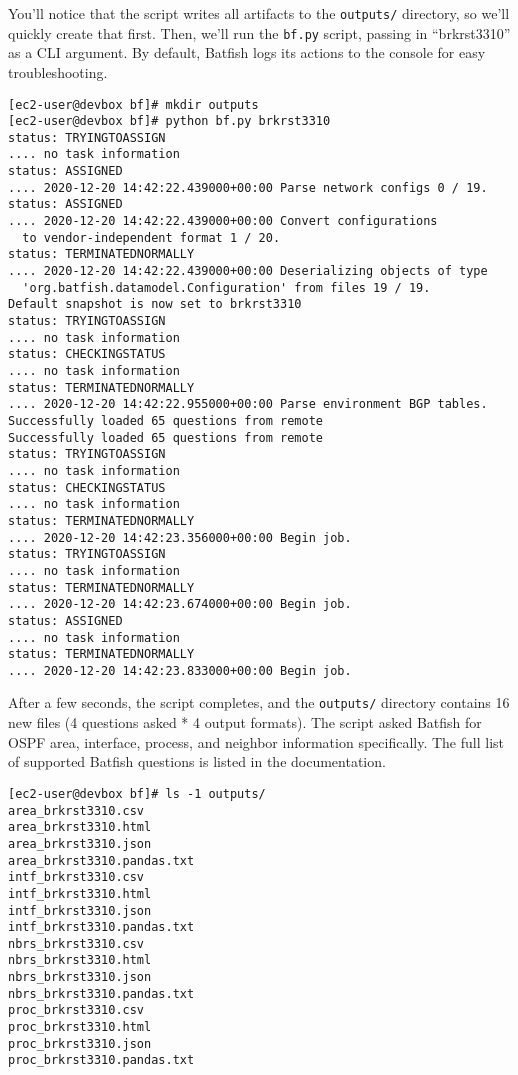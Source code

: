 You'll notice that the script writes all artifacts to the \verb|outputs/|
directory, so we'll quickly create that first. Then, we'll run the
\verb|bf.py| script, passing in ``brkrst3310'' as a CLI argument. By default,
Batfish logs its actions to the console for easy troubleshooting.

\begin{verbatim}
[ec2-user@devbox bf]# mkdir outputs
[ec2-user@devbox bf]# python bf.py brkrst3310
status: TRYINGTOASSIGN
.... no task information
status: ASSIGNED
.... 2020-12-20 14:42:22.439000+00:00 Parse network configs 0 / 19.
status: ASSIGNED
.... 2020-12-20 14:42:22.439000+00:00 Convert configurations
  to vendor-independent format 1 / 20.
status: TERMINATEDNORMALLY
.... 2020-12-20 14:42:22.439000+00:00 Deserializing objects of type
  'org.batfish.datamodel.Configuration' from files 19 / 19.
Default snapshot is now set to brkrst3310
status: TRYINGTOASSIGN
.... no task information
status: CHECKINGSTATUS
.... no task information
status: TERMINATEDNORMALLY
.... 2020-12-20 14:42:22.955000+00:00 Parse environment BGP tables.
Successfully loaded 65 questions from remote
Successfully loaded 65 questions from remote
status: TRYINGTOASSIGN
.... no task information
status: CHECKINGSTATUS
.... no task information
status: TERMINATEDNORMALLY
.... 2020-12-20 14:42:23.356000+00:00 Begin job.
status: TRYINGTOASSIGN
.... no task information
status: TERMINATEDNORMALLY
.... 2020-12-20 14:42:23.674000+00:00 Begin job.
status: ASSIGNED
.... no task information
status: TERMINATEDNORMALLY
.... 2020-12-20 14:42:23.833000+00:00 Begin job.
\end{verbatim}

After a few seconds, the script completes, and the \verb|outputs/| directory
contains 16 new files (4 questions asked * 4 output formats). The script asked
Batfish for OSPF area, interface, process, and neighbor information specifically.
The full list of supported Batfish questions is listed in the documentation.

\begin{verbatim}
[ec2-user@devbox bf]# ls -1 outputs/
area_brkrst3310.csv
area_brkrst3310.html
area_brkrst3310.json
area_brkrst3310.pandas.txt
intf_brkrst3310.csv
intf_brkrst3310.html
intf_brkrst3310.json
intf_brkrst3310.pandas.txt
nbrs_brkrst3310.csv
nbrs_brkrst3310.html
nbrs_brkrst3310.json
nbrs_brkrst3310.pandas.txt
proc_brkrst3310.csv
proc_brkrst3310.html
proc_brkrst3310.json
proc_brkrst3310.pandas.txt
\end{verbatim}

